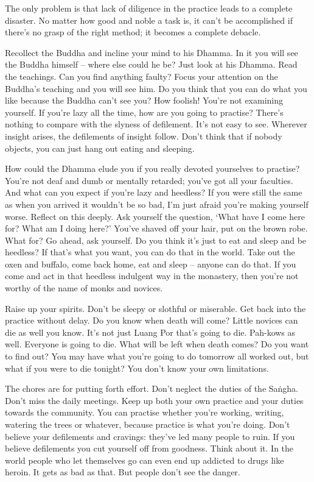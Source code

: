 The only problem is that lack of diligence in the practice leads to a complete disaster. No matter how good and noble a task is, it can't be accomplished if there's no grasp of the right method; it becomes a complete debacle.

Recollect the Buddha and incline your mind to his Dhamma. In it you will see the Buddha himself -- where else could he be? Just look at his Dhamma. Read the teachings. Can you find anything faulty? Focus your attention on the Buddha's teaching and you will see him. Do you think that you can do what you like because the Buddha can't see you? How foolish! You're not examining yourself. If you're lazy all the time, how are you going to practise? There's nothing to compare with the slyness of defilement. It's not easy to see. Wherever insight arises, the defilements of insight follow. Don't think that if nobody objects, you can just hang out eating and sleeping.

How could the Dhamma elude you if you really devoted yourselves to practise? You're not deaf and dumb or mentally retarded; you've got all your faculties. And what can you expect if you're lazy and heedless? If you were still the same as when you arrived it wouldn't be so bad, I'm just afraid you're making yourself worse. Reflect on this deeply. Ask yourself the question, `What have I come here for? What am I doing here?' You've shaved off your hair, put on the brown robe. What for? Go ahead, ask yourself. Do you think it's just to eat and sleep and be heedless? If that's what you want, you can do that in the world. Take out the oxen and buffalo, come back home, eat and sleep -- anyone can do that. If you come and act in that heedless indulgent way in the monastery, then you're not worthy of the name of monks and novices.

Raise up your spirits. Don't be sleepy or slothful or miserable. Get back into the practice without delay. Do you know when death will come? Little novices can die as well you know. It's not just Luang Por that's going to die. Pah-kows as well. Everyone is going to die. What will be left when death comes? Do you want to find out? You may have what you're going to do tomorrow all worked out, but what if you were to die tonight? You don't know your own limitations.

The chores are for putting forth effort. Don't neglect the duties of the Sa\.ngha. Don't miss the daily meetings. Keep up both your own practice and your duties towards the community. You can practise whether you're working, writing, watering the trees or whatever, because practice is what you're doing. Don't believe your defilements and cravings: they've led many people to ruin. If you believe defilements you cut yourself off from goodness. Think about it. In the world people who let themselves go can even end up addicted to drugs like heroin. It gets as bad as that. But people don't see the danger.

